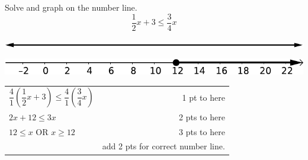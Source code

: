 {
	Solve and graph on the number line. $$\frac{1}{2}x+3 \leq \frac{3}{4}x$$\begin{onlyproblem}\begin{center}\includegraphics{numberLineNoNumbersNoTicks}\end{center}\end{onlyproblem} \begin{onlysolution}\begin{center}\includegraphics{fig095-07-5-a-answer}\end{center}\end{onlysolution}
}
{
	\begin{tabular}{l r}
	$\dfrac{4}{1}\left(\dfrac{1}{2}x+3\right) \leq \dfrac{4}{1}\left(\dfrac{3}{4}x\right)$ & 1 pt to here \\
	$2x+12\leq 3x$ & 2 pts to here \\
	$12\leq x$ OR $x\geq 12$ & 3 pts to here \\
	 & add 2 pts for correct number line.
	\end{tabular}
}

